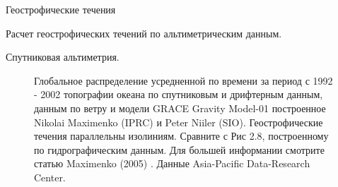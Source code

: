 \begin{chapter}{Геострофические течения}
\begin{section}{Расчет геострофических течений по альтиметрическим данным.}
\begin{paragraph}{Спутниковая альтиметрия.}
\begin{figure}[t!]
\caption{Глобальное распределение усредненной по времени за период с
1992 - 2002 топографии океана по спутниковым и дрифтерным данным,
данным по ветру и модели GRACE Gravity Model-01 построенное Nikolai
Maximenko (IPRC) и Peter Niiler (SIO).  Геострофические течения
параллельны изолиниям. Сравните с Рис 2.8, построенному по
гидрографическим данным. Для большей информании смотрите статью
Maximenko (2005) . Данные Asia-Pacific Data-Research Center.}
\label{fig:sshmean}
\vspace{-4ex}
\end{figure}
%


\end{paragraph}
\end{section}
\end{chapter}
